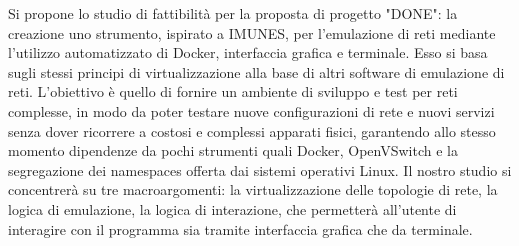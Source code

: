 \noindent
Si propone lo studio di fattibilità per la proposta di progetto "DONE": la creazione uno strumento, ispirato a IMUNES, per l'emulazione di reti mediante l'utilizzo automatizzato di Docker, interfaccia grafica e terminale.
\newline\newline
Esso si basa sugli stessi principi di virtualizzazione alla base di altri software di emulazione di reti. L'obiettivo è quello di fornire un ambiente di sviluppo e test per reti complesse, in modo da poter testare nuove configurazioni di rete e nuovi servizi senza dover ricorrere a costosi e complessi apparati fisici, garantendo allo stesso momento dipendenze da pochi strumenti quali Docker, OpenVSwitch e la segregazione dei namespaces offerta dai sistemi operativi Linux.
\newline\newline
Il nostro studio si concentrerà su tre macroargomenti: la virtualizzazione delle topologie di rete, la logica di emulazione, la logica di interazione, che permetterà all'utente di interagire con il programma sia tramite interfaccia grafica che da terminale.